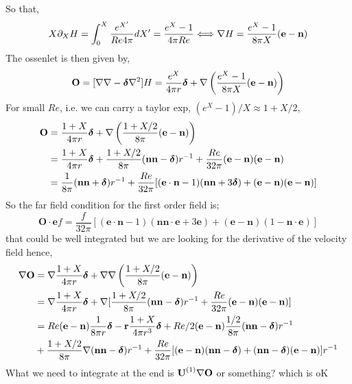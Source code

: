 So that,
\begin{equation}
    X \partial_X H =\int_0^X  \frac{e^{X'}}{Re 4\pi} dX' = \frac{e^X- 1}{4\pi Re}
    \Longleftrightarrow 
    \mathbf{\nabla} H = \frac{e^X- 1}{8\pi X} (\textbf{e}-\textbf{n})
\end{equation}
The ossenlet is then given by, 
\begin{equation}
    \textbf{O}
    = [\mathbf{\nabla}\mathbf{\nabla} - \bm\delta\mathbf{\nabla}^2] H 
    = 
    \frac{e^{X}}{4\pi r}\bm\delta
    +\mathbf{\nabla} \left(\frac{e^X- 1}{8\pi X} (\textbf{e}-\textbf{n})\right)
\end{equation}
For small $Re$, i.e. we can carry a taylor exp, $(e^X - 1)/X \approx 1+ X/2$, 
\begin{align*}
    \textbf{O}
    &= 
    \frac{1+X}{4\pi r}\bm\delta
    +\mathbf{\nabla} \left(\frac{1+X/2}{8\pi} (\textbf{e}-\textbf{n})\right)\\
    &= 
    \frac{1+X}{4\pi r}\bm\delta
    +\frac{1+X/2}{8\pi} (\textbf{nn}-\bm\delta) r^{-1}
    +\frac{Re}{32\pi} (\textbf{e}-\textbf{n})(\textbf{e}-\textbf{n})\\
    &= 
    \frac{1}{8\pi} (\textbf{nn}+\bm\delta) r^{-1}
    +\frac{Re}{32\pi} [(\textbf{e}\cdot \textbf{n} - 1) (\textbf{nn}+3\bm\delta)
    +(\textbf{e}-\textbf{n})(\textbf{e}-\textbf{n})]
\end{align*}
So the far field condition for the first order field is; 
\begin{equation}
    \textbf{O}\cdot \textbf{e}f
    = 
    \frac{f}{32\pi} [(\textbf{e}\cdot \textbf{n} - 1) (\textbf{nn}\cdot \textbf{e}+3\textbf{e})
    +(\textbf{e}-\textbf{n})(1-\textbf{n}\cdot \textbf{e})] 
\end{equation}
that could be well integrated but we are looking for the derivative of the velocity field hence, 
\begin{align*}
    \mathbf{\nabla}\textbf{O}
    &= 
    \mathbf{\nabla} \frac{1+X}{4\pi r}\bm\delta
    +\mathbf{\nabla}\mathbf{\nabla} \left(\frac{1+X/2}{8\pi} (\textbf{e}-\textbf{n})\right)\\
    &= 
    \mathbf{\nabla} \frac{1+X}{4\pi r}\bm\delta
    +\mathbf{\nabla} [\frac{1+X/2}{8\pi} (\textbf{nn}-\bm\delta) r^{-1}
    +\frac{Re}{32\pi} (\textbf{e}-\textbf{n})(\textbf{e}-\textbf{n})]\\
    &=
    Re (\textbf{e}-\textbf{n}) \frac{1}{8\pi r}\bm\delta
    - \textbf{r}\frac{1+X}{4\pi r^3}\bm\delta
    +Re/2(\textbf{e}-\textbf{n})\frac{1/2}{8\pi} (\textbf{nn}-\bm\delta) r^{-1}\\
    &+\frac{1+X/2}{8\pi} \mathbf{\nabla} (\textbf{nn}-\bm\delta) r^{-1}
    +\frac{Re}{32\pi} 
    [(\textbf{e}-\textbf{n}) (\textbf{nn}-\bm\delta) 
    + (\textbf{nn}-\bm\delta) (\textbf{e}-\textbf{n})] r^{-1}\\
\end{align*}
What we need to integrate at the end is $\textbf{U}^{(1)}\mathbf{\nabla} \textbf{O}$ or something? which is oK

